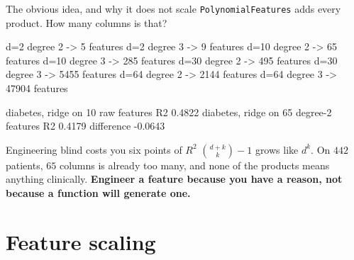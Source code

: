 \documentclass[aspectratio=169]{beamer}
\begin{document}
\begin{frame}[fragile,shrink=6]{The obvious idea, and why it does not scale}
\texttt{PolynomialFeatures} adds every product. How many columns is that?
\begin{outblk}
  d=2   degree 2 ->     5 features  d=2   degree 3 ->     9 features
  d=10  degree 2 ->    65 features  d=10  degree 3 ->   285 features
  d=30  degree 2 ->   495 features  d=30  degree 3 ->  5455 features
  d=64  degree 2 ->  2144 features  d=64  degree 3 -> 47904 features
\end{outblk}
\begin{outblk}
diabetes, ridge on 10 raw features        R2 0.4822
diabetes, ridge on 65 degree-2 features   R2 0.4179
difference                                   -0.0643
\end{outblk}
\begin{alertblock}{Engineering blind costs you six points of $R^2$}
  \footnotesize $\binom{d+k}{k}-1$ grows like $d^k$. On $442$ patients, $65$
  columns is already too many, and none of the products means anything
  clinically. \textbf{Engineer a feature because you have a reason, not
  because a function will generate one.}
\end{alertblock}
\end{frame}

\section[Scaling]{Feature scaling}
\label{sec:scale}
\end{document}
